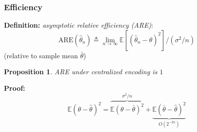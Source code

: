\documentclass[mathserif]{beamer}
\newtheorem{prop}{Proposition}
\begin{document}
\begin{frame}
\frametitle{Efficiency}
\textbf{Definition:} \emph{asymptotic relative efficiency (ARE)}:
\[
\mathrm{ARE}(\widehat{\theta}_n) \triangleq \lim_{n\rightarrow \infty} \mathbb E \left[ \left(\widehat{\theta}_n-\theta \right)^2 \right] / \left(\sigma^2 / n \right)
\]
(relative to sample mean $\bar{\theta}$)
\bigskip

\begin{prop} ARE under centralized encoding is $1$
\end{prop}
\textbf{Proof:}
\[
\mathbb E \left( \theta- \widehat{\theta} \right)^2 = \overbrace{\mathbb E \left( \theta- \bar{\theta} \right)^2}^{\sigma^2/n} + \underbrace{\mathbb E \left( \bar{\theta}- \widehat{\theta} \right)^2}_{O(2^{-2n})}
\]
\end{frame}

%
%
\end{document}
